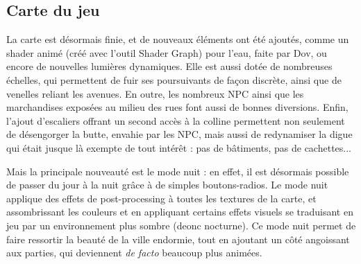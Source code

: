 \subsection{Carte du jeu}

La carte est désormais finie, et de nouveaux éléments ont été ajoutés, comme un shader animé (créé avec l'outil Shader Graph) pour l'eau,
faite par Dov, ou encore de nouvelles lumières dynamiques. Elle est aussi dotée de nombreuses échelles, qui permettent de fuir ses poursuivants 
de façon discrète, ainsi que de venelles reliant les avenues.
En outre, les nombreux NPC ainsi que les marchandises exposées au milieu des rues font aussi de bonnes diversions.
Enfin, l'ajout d'escaliers offrant un second accès à la colline permettent non seulement de désengorger la butte, envahie par les NPC, mais aussi 
de redynamiser la digue qui était jusque là exempte de tout intérêt : pas de bâtiments, pas de cachettes...

Mais la principale nouveauté est le mode nuit : en effet, il est désormais possible de passer du jour à la nuit grâce à de simples boutons-radios. 
Le mode nuit applique des effets de post-processing à toutes les textures de la carte, et assombrissant les couleurs et en appliquant certains effets 
visuels se traduisant en jeu par un environnement plus sombre (deonc nocturne). 
Ce mode nuit permet de faire ressortir la beauté de la ville endormie, tout en ajoutant un côté angoissant aux parties,
qui deviennent \textit{de facto} beaucoup plus animées.



